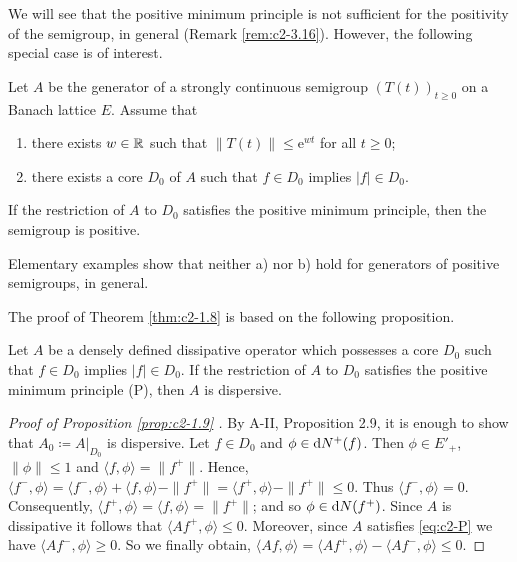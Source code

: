 We will see that the positive minimum principle is not sufficient for the positivity of the semigroup, in general (Remark \ref{rem:c2-3.16}).
However, the following special case is of interest.
\begin{theorem}\label{thm:c2-1.8}
%
%
%
Let $A$ be the generator of a strongly continuous semigroup $(T(t))_{t \geq 0}$ on a Banach lattice $E$.
Assume that
\begin{enumerate}[\upshape (i)]
\item \label{thm:c2-1.8-1}
there exists $w \in \mathbb{R}$ such that $\|T(t)\| \leq \mathrm{e}^{wt}$ for all $t \geq 0$;
\item \label{thm:c2-1.8-2}
there exists a core $D_{0}$ of $A$ such that $f \in D_{0}$ implies $|f| \in D_{0}$.
\end{enumerate}
If the restriction of $A$ to $D_{0}$ satisfies the positive minimum principle, then the semigroup is positive.
\end{theorem}
\begin{remark*}\label{rem:c2-1.8-Claude}
%
%
Elementary examples show that neither a) nor b) hold for generators of positive semigroups, in general.
\end{remark*}
The proof of Theorem \ref{thm:c2-1.8}   is based on the following proposition.
\begin{proposition}\label{prop:c2-1.9}
%
%
Let $A$ be a densely defined dissipative operator which possesses a core $D_{0}$ such that $f \in D_{0}$ implies $|f| \in D_{0}$.
If the restriction of $A$ to $D_{0}$ satisfies the positive minimum principle (P), then $A$ is dispersive.
\end{proposition}
\begin{proof}[Proof of Proposition \ref{prop:c2-1.9}  ]
By A-II, Proposition 2.9, it is enough to show that $A_{0} \coloneqq A|_{D_{0}}$ is dispersive.
Let $f \in D_{0}$ and $\phi \in \mathop{}\!\mathrm{d}{N^{+}}(f)$.
Then $\phi \in E'_{+}$, $\|\phi\| \leq 1$ and $\langle f,\phi \rangle = \|f^{+}\|$.
Hence, $\langle f^{-},\phi \rangle = \langle f^{-},\phi \rangle + \langle f,\phi \rangle - \|f^{+}\| = \langle f^{+},\phi \rangle - \|f^{+}\| \leq 0$.
Thus $\langle f^{-},\phi \rangle = 0$.
Consequently, $\langle f^{+},\phi \rangle = \langle f,\phi \rangle = \|f^{+}\|$; and so $\phi \in \mathop{}\!\mathrm{d}{N}(f^{+})$.
Since $A$ is dissipative it follows that $\langle Af^{+},\phi \rangle \leq 0$.
Moreover, since $A$ satisfies \eqref{eq:c2-P} we have $\langle Af^{-},\phi \rangle \geq 0$.
So we finally obtain, $\langle Af,\phi \rangle = \langle Af^{+},\phi \rangle - \langle Af^{-},\phi \rangle \leq 0$.
\end{proof}
